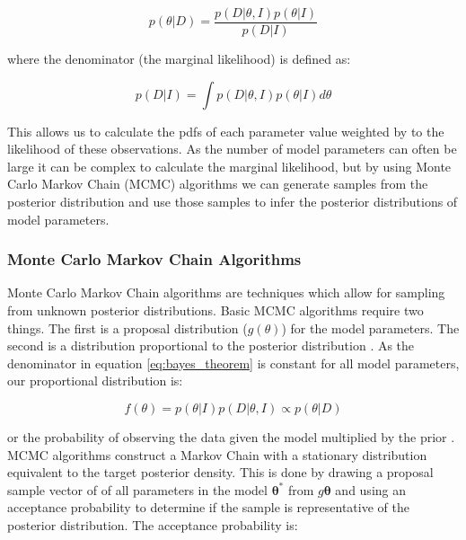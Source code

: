 \documentclass[ %
                    author={Tom Jager},
                supervisor={Dr. Daniel Schien},
                    degree={MEng},
                     title={A Bayesian Inference Engine for UMIS Structured Data},
                  subtitle={},
                      type={research},
                      year={2019} ]{dissertation}
\begin{document}
\begin{equation}
    \label{eq:bayes_theorem}
    p(\theta | D) = \frac{p(D | \theta, I)p(\theta|I)}{p(D | I)}
\end{equation}

where the denominator (the marginal likelihood) is defined as:

\begin{equation}
    \label{eq:marginal_likelihood}
    p(D| I) = \int{}{}p(D|\theta, I) p(\theta| I)d\theta 
\end{equation}

This allows us to calculate the pdfs of each parameter value weighted by to the likelihood of these observations. As the number of model parameters can often be large it can be complex to calculate the marginal likelihood, but by using Monte Carlo Markov Chain (MCMC) algorithms we can generate samples from the posterior distribution and use those samples to infer the posterior distributions of model parameters.

\subsubsection{Monte Carlo Markov Chain Algorithms}
Monte Carlo Markov Chain algorithms are techniques which allow for sampling from unknown posterior distributions. Basic MCMC algorithms require two things. The first is a  proposal distribution ($g(\theta)$) for the model parameters. The second is a distribution proportional to the posterior distribution \cite{green2015bayesian}. As the denominator in equation \ref{eq:bayes_theorem} is constant for all model parameters, our proportional distribution is:

\begin{equation}
    \label{eq:proportional_dist}
    f(\theta) =  p(\theta|I) p(D | \theta, I) \propto p(\theta | D)
\end{equation}

or the probability of observing the data given the model multiplied by the prior \cite{lupton2018incremental}. MCMC algorithms construct a Markov Chain with a stationary distribution equivalent to the target posterior density. This is done by drawing a proposal sample vector of of all parameters in the model $\bm{\theta}^*$ from $g\bm{\theta}$ and using an acceptance probability to determine if the sample is representative of the posterior distribution. The acceptance probability is:
\end{document}
